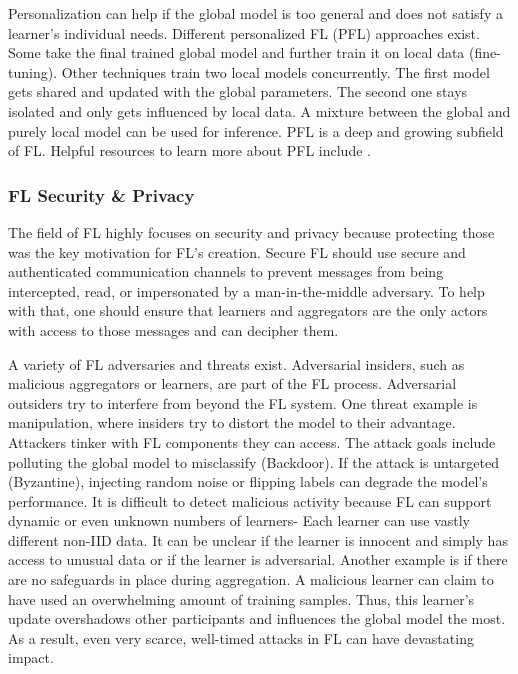 Personalization can help if the global model is too general and does not satisfy a learner's individual needs.
Different personalized FL (PFL) approaches exist.
Some take the final trained global model and further train it on local data (fine-tuning).
Other techniques train two local models concurrently.
The first model gets shared and updated with the global parameters.
The second one stays isolated and only gets influenced by local data.
A mixture between the global and purely local model can be used for inference.
PFL is a deep and growing subfield of FL.
Helpful resources to learn more about PFL include \cite{book:fl,hpfl_over_massive_mobile_edge_computing_networks, paper:adaptive_exper_models_for_pfl}.


\subsubsection{FL Security \& Privacy}
The field of FL highly focuses on security and privacy because protecting those was the key motivation for FL's creation.
Secure FL should use secure and authenticated communication channels to prevent messages from being intercepted, read, or impersonated by a man-in-the-middle adversary.
To help with that, one should ensure that learners and aggregators are the only actors with access to those messages and can decipher them.

A variety of FL adversaries and threats exist.
Adversarial insiders, such as malicious aggregators or learners, are part of the FL process.
Adversarial outsiders try to interfere from beyond the FL system.
One threat example is manipulation, where insiders try to distort the model to their advantage.
Attackers tinker with FL components they can access.
The attack goals include polluting the global model to misclassify (Backdoor).
If the attack is untargeted (Byzantine), injecting random noise or flipping labels can degrade the model's performance.
It is difficult to detect malicious activity because FL can support dynamic or even unknown numbers of learners-
Each learner can use vastly different non-IID data.
It can be unclear if the learner is innocent and simply has access to unusual data or if the learner is adversarial.
Another example is if there are no safeguards in place during aggregation.
A malicious learner can claim to have used an overwhelming amount of training samples.
Thus, this learner's update overshadows other participants and influences the global model the most.
As a result, even very scarce, well-timed attacks in FL can have devastating impact. \cite{book:fl}

